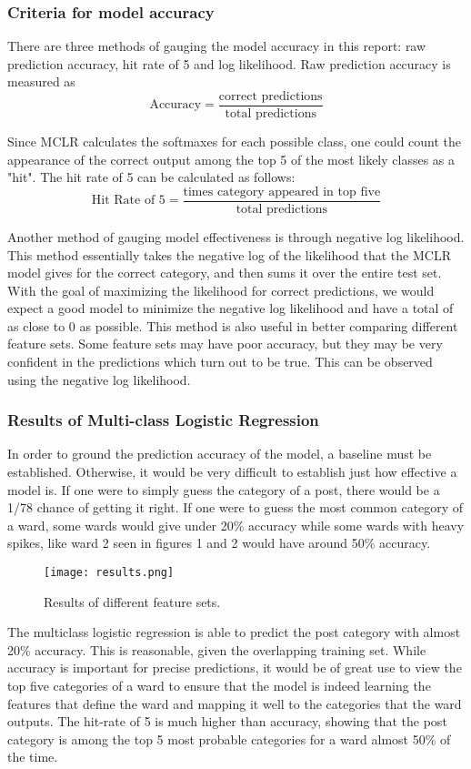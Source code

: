 \documentclass[12pt]{article}
\begin{document}
\subsubsection{Criteria for model accuracy}
There are three methods of gauging the model accuracy in this report: raw prediction accuracy, hit rate of 5 and log likelihood. Raw prediction accuracy is measured as 
\[\text{Accuracy} = \frac{\text{correct predictions}}{\text{total predictions}}\]

Since MCLR calculates the softmaxes for each possible class, one could count the appearance of the correct output among the top 5 of the most likely classes as a "hit". The hit rate of 5 can be calculated as follows:
\[\text{Hit Rate of 5} = \frac{\text{times category appeared in top five}}{\text{total predictions}}\]

Another method of gauging model effectiveness is through negative log likelihood. This method essentially takes the negative log of the likelihood that the MCLR model gives for the correct category, and then sums it over the entire test set. With the goal of maximizing the likelihood for correct predictions, we would expect a good model to minimize the negative log likelihood and have a total of as close to 0 as possible. This method is also useful in better comparing different feature sets. Some feature sets may have poor accuracy, but they may be very confident in the predictions which turn out to be true. This can be observed using the negative log likelihood.  

\subsubsection{Results of Multi-class Logistic Regression}

In order to ground the prediction accuracy of the model, a baseline must be established. Otherwise, it would be very difficult to establish just how effective a model is. 
If one were to simply guess the category of a post, there would be a 1/78 chance of getting it right. If one were to guess the most common category of a ward, some wards would give under 20\% accuracy while some wards with heavy spikes, like ward 2 seen in figures 1 and 2 would have around 50\% accuracy. 

\begin{figure}[h]
\centering
\texttt{[image: results.png]}
\caption{Results of different feature sets.}
\end{figure}
The multiclass logistic regression is able to predict the post category with almost 20\% accuracy. This is reasonable, given the overlapping training set. 
While accuracy is important for precise predictions, it would be of great use to view the top five categories of a ward to ensure that the model is indeed learning the features that define the ward and mapping it well to the categories that the ward outputs. The hit-rate of 5 is much higher than accuracy, showing that the post category is among the top 5 most probable categories for a ward almost 50\% of the time. 
\end{document}
